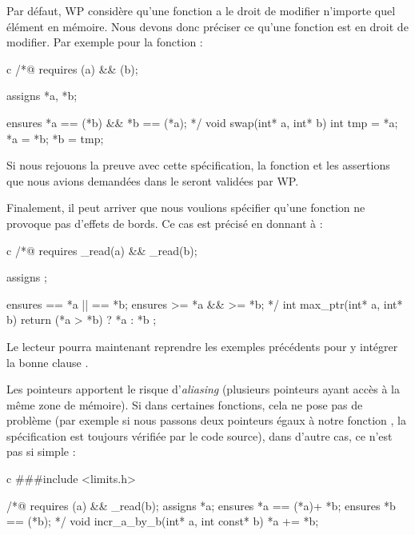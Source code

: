 \documentclass[middle]{zmdocument}
\begin{document}
Par défaut, WP considère qu'une fonction a le droit de modifier n'importe quel
élément en mémoire. Nous devons donc préciser ce qu'une fonction est en droit 
de modifier. Par exemple pour la fonction  :



\begin{CodeBlock}{c}
/*@
  requires \valid(a) && \valid(b);
 
  assigns *a, *b;

  ensures  *a == \old(*b) && *b == \old(*a);
*/
void swap(int* a, int* b){
  int tmp = *a;
  *a = *b;
  *b = tmp;
}
\end{CodeBlock}



Si nous rejouons la preuve avec cette spécification, la fonction et les 
assertions que nous avions demandées dans le  seront validées par WP.



Finalement, il peut arriver que nous voulions spécifier qu'une fonction ne 
provoque pas d'effets de bords. Ce cas est précisé en donnant 
à  :



\begin{CodeBlock}{c}
/*@
  requires \valid_read(a) && \valid_read(b);

  assigns  \nothing;

  ensures \result == *a || \result == *b;
  ensures \result >= *a && \result >= *b;
*/
int max_ptr(int* a, int* b){
  return (*a > *b) ? *a : *b ;
}
\end{CodeBlock}



Le lecteur pourra maintenant reprendre les exemples précédents pour y intégrer 
la bonne clause  .





Les pointeurs apportent le risque d'\textit{aliasing} (plusieurs pointeurs ayant accès à
la même zone de mémoire). Si dans certaines fonctions, cela ne pose pas de 
problème (par exemple si nous passons deux pointeurs égaux
à notre fonction , la spécification est toujours vérifiée par le 
code source), dans d'autre cas, ce n'est pas si simple :



\begin{CodeBlock}{c}
###include <limits.h>

/*@
  requires \valid(a) && \valid_read(b);
  assigns  *a;
  ensures  *a == \old(*a)+ *b;
  ensures  *b == \old(*b);
*/
void incr_a_by_b(int* a, int const* b){
  *a += *b;
}
\end{CodeBlock}
\end{document}
